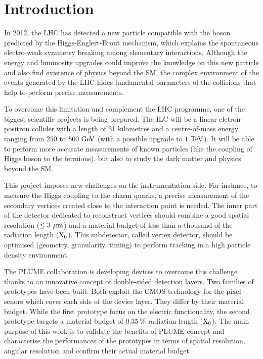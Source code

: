 \chapter{Introduction}

  In 2012, the \gls{LHC} has detected a new particle compatible with the boson predicted by the Higgs-Englert-Brout mechanism, which explains the spontaneous electro-weak symmetry breaking among elementary interactions.
  Although the energy and luminosity upgrades could improve the knowledge on this new particle and also find existence of physics beyond the \gls{SM}, the complex environment of the events generated by the \gls{LHC} hides fundamental parameters of the collisions that help to perform precise measurements.

  To overcome this limitation and complement the \gls{LHC} programme, one of the biggest scientific projects is being prepared. 
  The \gls{ILC} will be a linear eletron-positron collider with a length of 31 kilometres and a centre-of-mass energy ranging from  $250$ to $500~\rm{GeV}$ (with a possible upgrade to $1~\rm{TeV}$). 
  It will be able to perform more accurate measurements of known particles (like the coupling of Higgs boson to the fermions), but also to study the dark matter and physics beyond the \gls{SM}. 
  
  This project imposes new challenges on the instrumentation side. 
  For instance, to measure the Higgs coupling to the charm quarks, a precise measurement of the secondary vertices created close to the interaction point is needed.
  The inner part of the detector dedicated to reconstruct vertices should combine a good spatial resolution ($\leq 3~\rm{\mu m}$) and a material budget of less than a thousand of the radiation length ($\rm{X_0}$).
  This subdetector, called vertex detector, should be optimised (geometry, granularity, timing) to perform tracking in a high particle density environment.
  
  The \gls{PLUME} collaboration is developing devices to overcome this challenge thanks to an innovative concept of double-sided detection layers.
  Two families of prototypes have been built.
  Both exploit the \gls{CMOS} technology for the pixel senors which cover each side of the device layer.
  They differ by their material budget.
  While the first prototype focus on the electric functionality, the second prototype targets a material budget of $0.35~\%$ radiation length ($\rm{X_{0}}$).
  The main purpose of this work is to validate the benefits of \gls{PLUME} concept and characterise the performances of the prototypes in terms of spatial resolution, angular resolution and confirm their actual material budget.
  
